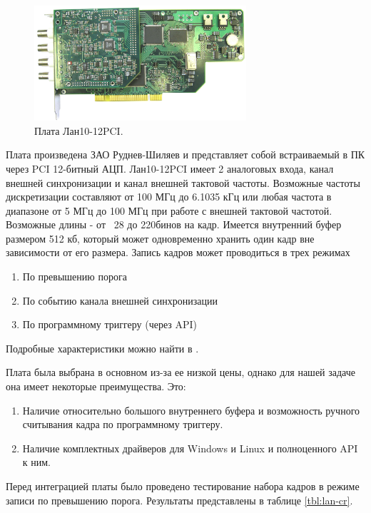 \documentclass[a4paper,14pt]{extreport}
\begin{document}
\begin{figure}
  \centering
  \includegraphics[width = 0.7\textwidth]{img/signals/Lan10-12PCI.jpg}
    \caption{Плата Лан10-12PCI.}
    \label{fig:lan10-view}
\end{figure}

Плата произведена ЗАО {\textquotedbl}Руднев-Шиляев{\textquotedbl} и представляет собой встраиваемый в ПК через PCI 12-битный АЦП. Лан10-12PCI имеет 2 аналоговых входа, канал внешней синхронизации и канал внешней тактовой частоты. Возможные частоты дискретизации составляют от 100 МГц до 6.1035 кГц или любая частота в диапазоне от 5 МГц до 100 МГц при работе с внешней тактовой частотой. Возможные длины - от ~28 до 220бинов на кадр. Имеется внутренний буфер размером 512 кб, который может одновременно хранить один кадр вне зависимости от его размера. Запись кадров может проводиться в трех режимах

\begin{enumerate}
    \item По превышению порога
    \item По событию канала внешней синхронизации
    \item По программному триггеру (через API)
\end{enumerate}
Подробные характеристики можно найти в .

Плата была выбрана в основном из-за ее низкой цены, однако для нашей задаче она имеет некоторые преимущества. Это:

\begin{enumerate}
    \item Наличие относительно большого внутреннего буфера и возможность ручного считывания кадра по программному триггеру.
    \item Наличие комплектных драйверов для Windows и Linux и полноценного API к ним.
\end{enumerate}
Перед интеграцией платы было проведено тестирование набора кадров в режиме записи по превышению порога. Результаты представлены в таблице \ref{tbl:lan-cr}.
\end{document}
